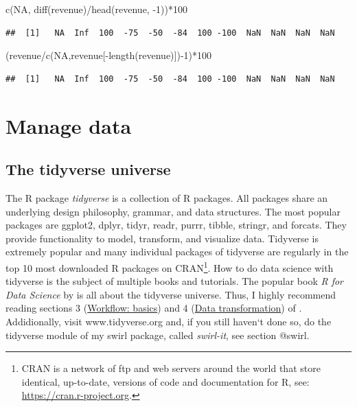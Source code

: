 \documentclass[
  12pt,
  oneside]{book}
\newenvironment{Shaded}{\begin{snugshade}}{\end{snugshade}}
\newcommand{\ConstantTok}[1]{\textcolor[rgb]{0.00,0.00,0.00}{#1}}
\newcommand{\DecValTok}[1]{\textcolor[rgb]{0.00,0.00,0.81}{#1}}
\newcommand{\FunctionTok}[1]{\textcolor[rgb]{0.00,0.00,0.00}{#1}}
\newcommand{\NormalTok}[1]{#1}
\newcommand{\SpecialCharTok}[1]{\textcolor[rgb]{0.00,0.00,0.00}{#1}}
\theoremstyle{definition}
\theoremstyle{definition}
\theoremstyle{definition}
\theoremstyle{definition}
\theoremstyle{remark}
\begin{document}
\begin{Shaded}
\begin{Highlighting}[]
\FunctionTok{c}\NormalTok{(}\ConstantTok{NA}\NormalTok{, }\FunctionTok{diff}\NormalTok{(revenue)}\SpecialCharTok{/}\FunctionTok{head}\NormalTok{(revenue, }\SpecialCharTok{{-}}\DecValTok{1}\NormalTok{))}\SpecialCharTok{*}\DecValTok{100}        
\end{Highlighting}
\end{Shaded}

\begin{verbatim}
##  [1]   NA  Inf  100  -75  -50  -84  100 -100  NaN  NaN  NaN  NaN
\end{verbatim}

\begin{Shaded}
\begin{Highlighting}[]
\NormalTok{(revenue}\SpecialCharTok{/}\FunctionTok{c}\NormalTok{(}\ConstantTok{NA}\NormalTok{,revenue[}\SpecialCharTok{{-}}\FunctionTok{length}\NormalTok{(revenue)])}\SpecialCharTok{{-}}\DecValTok{1}\NormalTok{)}\SpecialCharTok{*}\DecValTok{100}
\end{Highlighting}
\end{Shaded}

\begin{verbatim}
##  [1]   NA  Inf  100  -75  -50  -84  100 -100  NaN  NaN  NaN  NaN
\end{verbatim}

\hypertarget{manage-data}{%
\chapter{Manage data}\label{manage-data}}

\hypertarget{the-tidyverse-universe}{%
\section{The tidyverse universe}\label{the-tidyverse-universe}}

The R package \emph{tidyverse} is a collection of R packages. All packages share an underlying design philosophy, grammar, and data structures.
The most popular packages are ggplot2, dplyr, tidyr, readr, purrr, tibble, stringr, and forcats. They provide functionality to model, transform, and visualize data. Tidyverse is extremely popular and many individual packages of tidyverse are regularly in the top 10 most downloaded R packages on CRAN\footnote{CRAN is a network of ftp and web servers around the world that store identical, up-to-date, versions of code and documentation for R, see: \url{https://cran.r-project.org}.}. How to do data science with tidyverse is the subject of multiple books and tutorials. The popular book \emph{R for Data Science} by \citet{Wickham2023R} is all about the tidyverse universe. Thus, I highly recommend reading sections 3 (\href{https://r4ds.hadley.nz/workflow-basics.html}{Workflow: basics}) and 4 (\href{https://r4ds.hadley.nz/data-transform.html}{Data transformation}) of \citet{Wickham2023R}. Addidionally, visit www.tidyverse.org and, if you still haven`t done so, do the tidyverse module of my swirl package, called \emph{swirl-it}, see section @swirl.
\end{document}
